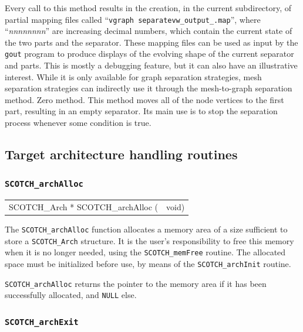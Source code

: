 \begin{itemize}
Every call to this method results in the creation, in the current
subdirectory, of partial mapping files called ``{\tt vgraph\lbt
separate\lbt vw\_\lbt output\_.map}'', where
``{\it nnnnnnnn}'' are increasing decimal numbers, which contain the
current state of the two parts and the separator. These mapping files
can be used as input by the {\tt gout} program to produce displays of
the evolving shape of the current separator and parts. This is mostly
a debugging feature, but it can also have an illustrative interest.
While it is only available for graph separation strategies, mesh
separation strategies can indirectly use it through the mesh-to-graph
separation method.
\iteme[{\tt z}]
Zero method. This method moves all of the node vertices to the first
part, resulting in an empty separator. Its main use is to stop the
separation process whenever some condition is true.
\end{itemize}

\subsection{Target architecture handling routines}
\label{sec-lib-arch-handling}

\subsubsection{{\tt SCOTCH\_archAlloc}}

\begin{itemize}
\progsyn

{\tt\begin{tabular}{l@{}l}
SCOTCH\_Arch * SCOTCH\_archAlloc ( & void)
\end{tabular}}

\progdes

The {\tt SCOTCH\_archAlloc} function allocates a memory area of a
size sufficient to store a {\tt SCOTCH\_\lbt Arch} structure. It is
the user's responsibility to free this memory when it is no longer
needed, using the {\tt SCOTCH\_\lbt mem\lbt Free} routine. The
allocated space must be initialized before use, by means of the
{\tt SCOTCH\_\lbt arch\lbt Init} routine.

\progret

{\tt SCOTCH\_archAlloc} returns the pointer to the memory area if it
has been successfully allocated, and {\tt NULL} else.
\end{itemize}

\subsubsection{{\tt SCOTCH\_archExit}}

